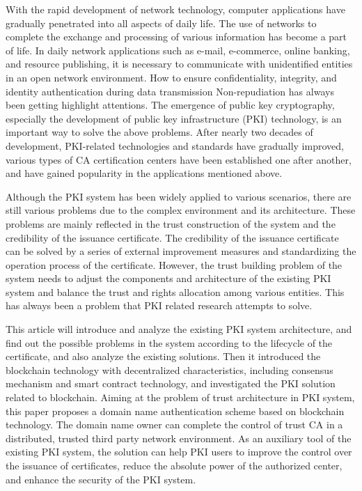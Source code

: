 \begin{eabstract}
With the rapid development of network technology, computer applications have gradually penetrated into all aspects of daily life. The use of networks to complete the exchange and processing of various information has become a part of life. In daily network applications such as e-mail, e-commerce, online banking, and resource publishing, it is necessary to communicate with unidentified entities in an open network environment. How to ensure confidentiality, integrity, and identity authentication during data transmission Non-repudiation has always been getting highlight attentions. The emergence of public key cryptography, especially the development of public key infrastructure (PKI) technology, is an important way to solve the above problems. After nearly two decades of development, PKI-related technologies and standards have gradually improved, various types of CA certification centers have been established one after another, and have gained popularity in the applications mentioned above.

Although the PKI system has been widely applied to various scenarios, there are still various problems due to the complex environment and its architecture. These problems are mainly reflected in the trust construction of the system and the credibility of the issuance certificate. The credibility of the issuance certificate can be solved by a series of external improvement measures and standardizing the operation process of the certificate. However, the trust building problem of the system needs to adjust the components and architecture of the existing PKI system and balance the trust and rights allocation among various entities. This has always been a problem that PKI related research attempts to solve.

This article will introduce and analyze the existing PKI system architecture, and find out the possible problems in the system according to the lifecycle of the certificate, and also analyze the existing solutions. Then it introduced the blockchain technology with decentralized characteristics, including consensus mechanism and smart contract technology, and investigated the PKI solution related to blockchain. Aiming at the problem of trust architecture in PKI system, this paper proposes a domain name authentication scheme based on blockchain technology. The domain name owner can complete the control of trust CA in a distributed, trusted third party network environment. As an auxiliary tool of the existing PKI system, the solution can help PKI users to improve the control over the issuance of certificates, reduce the absolute power of the authorized center, and enhance the security of the PKI system.


\end{eabstract}
